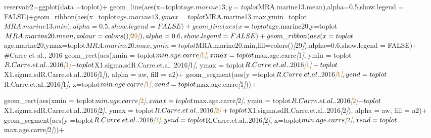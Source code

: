 \documentclass[
]{article}
\newenvironment{Shaded}{\begin{snugshade}}{\end{snugshade}}
\newcommand{\CommentTok}[1]{\textcolor[rgb]{0.56,0.35,0.01}{\textit{#1}}}
\newcommand{\NormalTok}[1]{#1}
\newcommand{\OtherTok}[1]{\textcolor[rgb]{0.56,0.35,0.01}{#1}}
\begin{document}
\begin{Shaded}
\begin{Highlighting}[]
\NormalTok{reservoir2=ggplot(data =toplot)+}
\NormalTok{  geom\_line(aes(x=toplot$age.marine13,y=toplot$MRA.marine13.mean),alpha=0.5,show.legend = FALSE)+geom\_ribbon(aes(x=toplot$age.marine13,ymax=toplot$MRA.marine13.max,ymin=toplot$MRA.marine13.min),alpha=0.5,show.legend = FALSE)+}
\NormalTok{  geom\_line(aes(x=toplot$age.marine20,y=toplot$MRA.marine20.mean,colour=colors()}\CommentTok{[}\OtherTok{29}\CommentTok{]}\NormalTok{),alpha=0.6,show.legend = FALSE)+geom\_ribbon(aes(x=toplot$age.marine20,ymax=toplot$MRA.marine20.max,ymin=toplot$MRA.marine20.min,fill=colors()}\CommentTok{[}\OtherTok{29}\CommentTok{]}\NormalTok{),alpha=0.6,show.legend = FALSE)+}
\NormalTok{\#Carre et al., 2016}
\NormalTok{geom\_rect(aes(xmin = toplot$min.age.carre}\CommentTok{[}\OtherTok{1}\CommentTok{]}\NormalTok{, }
\NormalTok{              xmax = toplot$max.age.carre}\CommentTok{[}\OtherTok{1}\CommentTok{]}\NormalTok{, }
\NormalTok{              ymin = toplot$R.Carre.et.al..2016}\CommentTok{[}\OtherTok{1}\CommentTok{]}\NormalTok{{-}toplot$X1.sigma.sdR.Carre.et.al..2016}\CommentTok{[}\OtherTok{1}\CommentTok{]}\NormalTok{,}
\NormalTok{              ymax = toplot$R.Carre.et.al..2016}\CommentTok{[}\OtherTok{1}\CommentTok{]}\NormalTok{+toplot$X1.sigma.sdR.Carre.et.al..2016}\CommentTok{[}\OtherTok{1}\CommentTok{]}\NormalTok{),}
\NormalTok{          alpha = aw,}
\NormalTok{          fill = a2)+}
\NormalTok{  geom\_segment(aes(y =toplot$R.Carre.et.al..2016}\CommentTok{[}\OtherTok{1}\CommentTok{]}\NormalTok{,}
\NormalTok{                   yend =toplot$R.Carre.et.al..2016}\CommentTok{[}\OtherTok{1}\CommentTok{]}\NormalTok{,}
\NormalTok{                   x=toplot$min.age.carre}\CommentTok{[}\OtherTok{1}\CommentTok{]}\NormalTok{,}
\NormalTok{                   xend=toplot$max.age.carre}\CommentTok{[}\OtherTok{1}\CommentTok{]}\NormalTok{))+}
  
\NormalTok{  geom\_rect(aes(xmin = toplot$min.age.carre}\CommentTok{[}\OtherTok{2}\CommentTok{]}\NormalTok{, }
\NormalTok{                xmax = toplot$max.age.carre}\CommentTok{[}\OtherTok{2}\CommentTok{]}\NormalTok{, }
\NormalTok{                ymin = toplot$R.Carre.et.al..2016}\CommentTok{[}\OtherTok{2}\CommentTok{]}\NormalTok{{-}toplot$X1.sigma.sdR.Carre.et.al..2016}\CommentTok{[}\OtherTok{2}\CommentTok{]}\NormalTok{,}
\NormalTok{                ymax = toplot$R.Carre.et.al..2016}\CommentTok{[}\OtherTok{2}\CommentTok{]}\NormalTok{+toplot$X1.sigma.sdR.Carre.et.al..2016}\CommentTok{[}\OtherTok{2}\CommentTok{]}\NormalTok{),}
\NormalTok{            alpha = aw,}
\NormalTok{            fill = a2)+}
\NormalTok{  geom\_segment(aes(y =toplot$R.Carre.et.al..2016}\CommentTok{[}\OtherTok{2}\CommentTok{]}\NormalTok{,}
\NormalTok{                   yend =toplot$R.Carre.et.al..2016}\CommentTok{[}\OtherTok{2}\CommentTok{]}\NormalTok{,}
\NormalTok{                   x=toplot$min.age.carre}\CommentTok{[}\OtherTok{2}\CommentTok{]}\NormalTok{,}
\NormalTok{                   xend=toplot$max.age.carre}\CommentTok{[}\OtherTok{2}\CommentTok{]}\NormalTok{))+}
  

\end{Highlighting}
\end{Shaded}
\end{document}

